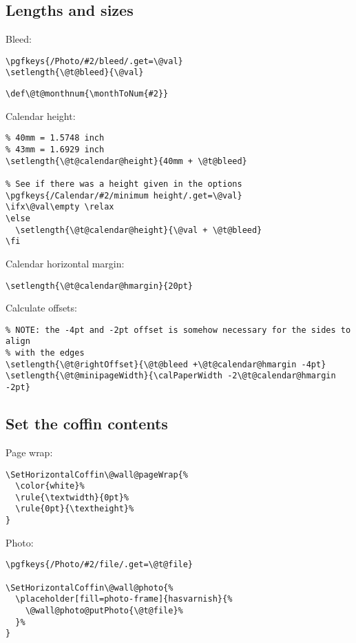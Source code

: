 \documentclass[11pt,oneside]{memoir-article}
\begin{document}
\subsection{Lengths and sizes}
\label{sec:org14e3366}

Bleed:

\begin{verbatim}
\pgfkeys{/Photo/#2/bleed/.get=\@val}
\setlength{\@t@bleed}{\@val}
\end{verbatim}

\begin{verbatim}
\def\@t@monthnum{\monthToNum{#2}}
\end{verbatim}

Calendar height:

\begin{verbatim}
% 40mm = 1.5748 inch
% 43mm = 1.6929 inch
\setlength{\@t@calendar@height}{40mm + \@t@bleed}

% See if there was a height given in the options
\pgfkeys{/Calendar/#2/minimum height/.get=\@val}
\ifx\@val\empty \relax
\else
  \setlength{\@t@calendar@height}{\@val + \@t@bleed}
\fi
\end{verbatim}

Calendar horizontal margin:

\begin{verbatim}
\setlength{\@t@calendar@hmargin}{20pt}
\end{verbatim}

Calculate offsets:

\begin{verbatim}
% NOTE: the -4pt and -2pt offset is somehow necessary for the sides to align
% with the edges
\setlength{\@t@rightOffset}{\@t@bleed +\@t@calendar@hmargin -4pt}
\setlength{\@t@minipageWidth}{\calPaperWidth -2\@t@calendar@hmargin -2pt}
\end{verbatim}

\subsection{Set the coffin contents}
\label{sec:orgd76e8bd}

Page wrap:

\begin{verbatim}
\SetHorizontalCoffin\@wall@pageWrap{%
  \color{white}%
  \rule{\textwidth}{0pt}%
  \rule{0pt}{\textheight}%
}
\end{verbatim}

Photo:

\begin{verbatim}
\pgfkeys{/Photo/#2/file/.get=\@t@file}

\SetHorizontalCoffin\@wall@photo{%
  \placeholder[fill=photo-frame]{hasvarnish}{%
    \@wall@photo@putPhoto{\@t@file}%
  }%
}
\end{verbatim}
\end{document}

